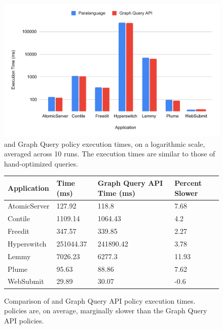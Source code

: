 \begin{figure}
    \begin{centering}
        \includegraphics[scale=0.6]{graphics/times.pdf}
        \caption{
            \syslang{} and Graph Query policy execution times, on a logarithmic scale, averaged across 10 runs. 
            The \syslang{} execution times are similar to those of hand-optimized queries.
        }
        \label{f:times}
    \end{centering}
\end{figure}
%
\begin{figure}
    \small
    \begin{tabular}{|p{2.75cm}|p{2.75cm}|p{2.75cm}|p{2.75cm}|}
        \hline
        \textbf{Application} & \textbf{\syslang{} Time (ms)} & \textbf{Graph Query API Time (ms)} & \textbf{\syslang{} Percent Slower} \\ \hline
        AtomicServer & 127.92    & 118.8     & 7.68  \\ \hline
        Contile      & 1109.14   & 1064.43   & 4.2   \\ \hline
        Freedit      & 347.57    & 339.85    & 2.27  \\ \hline
        Hyperswitch  & 251044.37 & 241890.42 & 3.78  \\ \hline
        Lemmy        & 7026.23   & 6277.3    & 11.93 \\ \hline
        Plume        & 95.63     & 88.86     & 7.62  \\ \hline
        WebSubmit    & 29.89     & 30.07     & -0.6  \\ \hline               
        \end{tabular}
        \caption{
            Comparison of \syslang{} and Graph Query API policy execution times. 
            \syslang{} policies are, on average, marginally slower than the Graph Query API policies. 
        }
        \label{f:percentages}
\end{figure}

